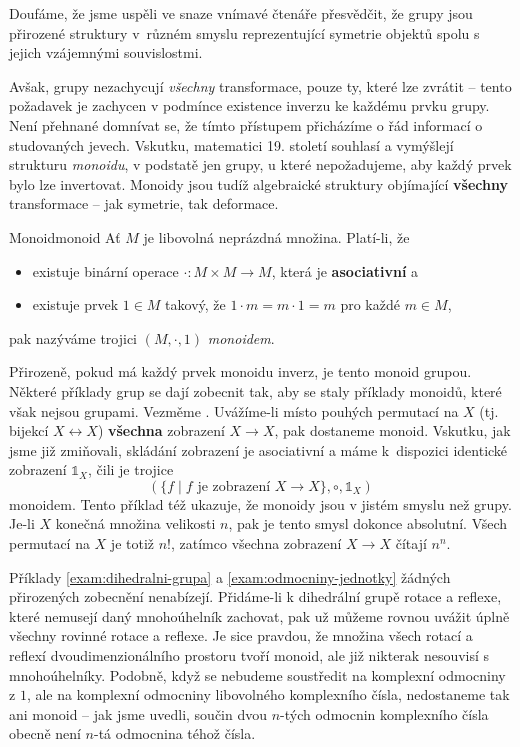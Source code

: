 Doufáme, že jsme uspěli ve snaze vnímavé čtenáře přesvědčit, že grupy jsou
přirozené struktury v~různém smyslu reprezentující symetrie objektů spolu s
jejich vzájemnými souvislostmi.

Avšak, grupy nezachycují \emph{všechny} transformace, pouze ty, které lze
zvrátit -- tento požadavek je zachycen v podmínce existence inverzu ke každému
prvku grupy. Není přehnané domnívat se, že tímto přístupem přicházíme o řád
informací o studovaných jevech. Vskutku, matematici 19. století souhlasí a
vymýšlejí strukturu \emph{monoidu}, v podstatě jen grupy, u které nepožadujeme,
aby každý prvek bylo lze invertovat. Monoidy jsou tudíž algebraické struktury
objímající \textbf{všechny} transformace -- jak symetrie, tak deformace.

\begin{definition}{Monoid}{monoid}
 Ať $M$ je libovolná neprázdná množina. Platí-li, že
 \begin{itemize}
  \item existuje binární operace $ \cdot :M \times M \to M$, která je
   \textbf{asociativní} a
  \item existuje prvek $1 \in M$ takový, že $1 \cdot m = m \cdot 1 = m$ pro
   každé $m \in M$,
 \end{itemize}
 pak nazýváme trojici $(M, \cdot ,1)$ \emph{monoidem}.
\end{definition}

Přirozeně, pokud má každý prvek monoidu inverz, je tento monoid grupou. Některé
příklady grup se dají zobecnit tak, aby se staly příklady monoidů, které však
nejsou grupami. Vezměme . Uvážíme-li místo
pouhých permutací na $X$ (tj. bijekcí $X \leftrightarrow X$) \textbf{všechna}
zobrazení $X \to X$, pak dostaneme monoid. Vskutku, jak jsme již zmiňovali,
skládání zobrazení je asociativní a máme k~dispozici identické zobrazení
$\mathds{1}_X$, čili je trojice
\[
 (\{f \mid f \text{ je zobrazení } X \to X\}, \circ ,\mathds{1}_X)
\]
monoidem. Tento příklad též ukazuje, že monoidy jsou v jistém smyslu 
než grupy. Je-li $X$ konečná množina velikosti $n$, pak je tento smysl dokonce
absolutní. Všech permutací na $X$ je totiž $n!$, zatímco všechna zobrazení $X
\to X$ čítají $n^{n}$.

Příklady \ref{exam:dihedralni-grupa} a \ref{exam:odmocniny-jednotky} žádných
přirozených zobecnění nenabízejí. Přidáme-li k dihedrální grupě rotace a
reflexe, které nemusejí daný mnohoúhelník zachovat, pak už můžeme rovnou uvážit
úplně všechny rovinné rotace a reflexe. Je sice pravdou, že množina všech rotací
a reflexí dvoudimenzionálního prostoru tvoří monoid, ale již nikterak nesouvisí
s mnohoúhelníky. Podobně, když se nebudeme soustředit na komplexní odmocniny z
$1$, ale na komplexní odmocniny libovolného komplexního čísla, nedostaneme tak
ani monoid -- jak jsme uvedli, součin dvou $n$-tých odmocnin komplexního čísla
obecně není $n$-tá odmocnina téhož čísla.

